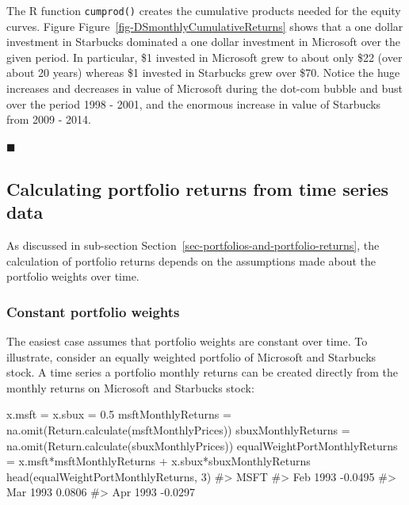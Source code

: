 \documentclass[
  letterpaper,
  DIV=11,
  numbers=noendperiod]{scrreprt}
\newenvironment{Shaded}{\begin{snugshade}}{\end{snugshade}}
\newcommand{\CommentTok}[1]{\textcolor[rgb]{0.37,0.37,0.37}{#1}}
\newcommand{\DecValTok}[1]{\textcolor[rgb]{0.68,0.00,0.00}{#1}}
\newcommand{\FloatTok}[1]{\textcolor[rgb]{0.68,0.00,0.00}{#1}}
\newcommand{\FunctionTok}[1]{\textcolor[rgb]{0.28,0.35,0.67}{#1}}
\newcommand{\NormalTok}[1]{\textcolor[rgb]{0.00,0.23,0.31}{#1}}
\newcommand{\OtherTok}[1]{\textcolor[rgb]{0.00,0.23,0.31}{#1}}
\newcommand{\SpecialCharTok}[1]{\textcolor[rgb]{0.37,0.37,0.37}{#1}}
\theoremstyle{definition}
\theoremstyle{definition}
\theoremstyle{remark}
\begin{document}
The R function \texttt{cumprod()} creates the cumulative products needed
for the equity curves. Figure
Figure~\ref{fig-DSmonthlyCumulativeReturns} shows that a one dollar
investment in Starbucks dominated a one dollar investment in Microsoft
over the given period. In particular, \$1 invested in Microsoft grew to
about only \$22 (over about 20 years) whereas \$1 invested in Starbucks
grew over \$70. Notice the huge increases and decreases in value of
Microsoft during the dot-com bubble and bust over the period 1998 -
2001, and the enormous increase in value of Starbucks from 2009 - 2014.

\hfill{}\(\blacksquare\)

\hypertarget{calculating-portfolio-returns-from-time-series-data}{%
\subsection{Calculating portfolio returns from time series
data}\label{calculating-portfolio-returns-from-time-series-data}}

As discussed in sub-section
Section~\ref{sec-portfolios-and-portfolio-returns}, the calculation of
portfolio returns depends on the assumptions made about the portfolio
weights over time.

\hypertarget{constant-portfolio-weights-1}{%
\subsubsection{Constant portfolio
weights}\label{constant-portfolio-weights-1}}

The easiest case assumes that portfolio weights are constant over time.
To illustrate, consider an equally weighted portfolio of Microsoft and
Starbucks stock. A time series a portfolio monthly returns can be
created directly from the monthly returns on Microsoft and Starbucks
stock:

\begin{Shaded}
\begin{Highlighting}[]
\NormalTok{x.msft }\OtherTok{=}\NormalTok{ x.sbux }\OtherTok{=} \FloatTok{0.5}
\NormalTok{msftMonthlyReturns }\OtherTok{=} \FunctionTok{na.omit}\NormalTok{(}\FunctionTok{Return.calculate}\NormalTok{(msftMonthlyPrices))}
\NormalTok{sbuxMonthlyReturns }\OtherTok{=} \FunctionTok{na.omit}\NormalTok{(}\FunctionTok{Return.calculate}\NormalTok{(sbuxMonthlyPrices))}
\NormalTok{equalWeightPortMonthlyReturns }\OtherTok{=}\NormalTok{ x.msft}\SpecialCharTok{*}\NormalTok{msftMonthlyReturns }\SpecialCharTok{+} 
\NormalTok{  x.sbux}\SpecialCharTok{*}\NormalTok{sbuxMonthlyReturns}
\FunctionTok{head}\NormalTok{(equalWeightPortMonthlyReturns, }\DecValTok{3}\NormalTok{)}
\CommentTok{\#\textgreater{}             MSFT}
\CommentTok{\#\textgreater{} Feb 1993 {-}0.0495}
\CommentTok{\#\textgreater{} Mar 1993  0.0806}
\CommentTok{\#\textgreater{} Apr 1993 {-}0.0297}
\end{Highlighting}
\end{Shaded}
\end{document}
